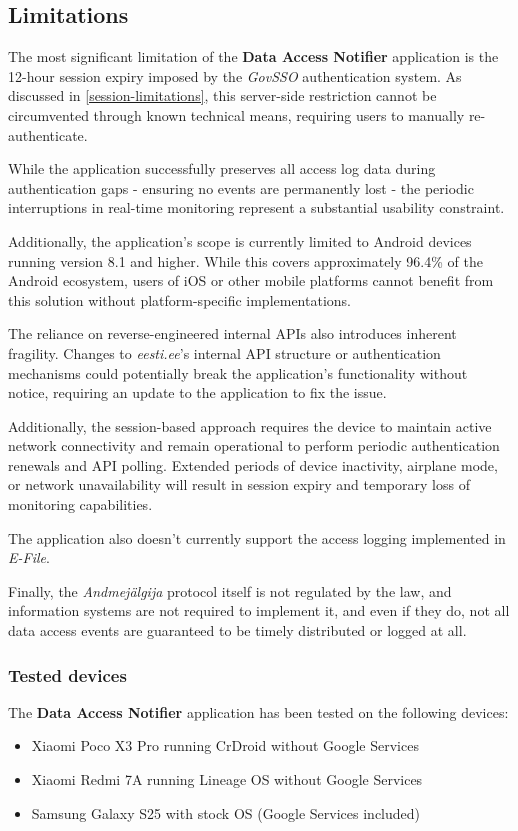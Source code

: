 \subsection{Limitations}
The most significant limitation of the \textbf{Data Access Notifier} application is the 12-hour session expiry imposed by the \textit{GovSSO} authentication system. As discussed in \ref{session-limitations}, this server-side restriction cannot be circumvented through known technical means, requiring users to manually re-authenticate.

While the application successfully preserves all access log data during authentication gaps - ensuring no events are permanently lost - the periodic interruptions in real-time monitoring represent a substantial usability constraint.

Additionally, the application's scope is currently limited to Android devices running version 8.1 and higher. While this covers approximately 96.4\% of the Android ecosystem, users of iOS or other mobile platforms cannot benefit from this solution without platform-specific implementations.

The reliance on reverse-engineered internal APIs also introduces inherent fragility. Changes to \textit{eesti.ee}'s internal API structure or authentication mechanisms could potentially break the application's functionality without notice, requiring an update to the application to fix the issue.

Additionally, the session-based approach requires the device to maintain active network connectivity and remain operational to perform periodic authentication renewals and API polling. Extended periods of device inactivity, airplane mode, or network unavailability will result in session expiry and temporary loss of monitoring capabilities.

The application also doesn't currently support the access logging implemented in \textit{E-File}.

Finally, the \textit{Andmejälgija} protocol itself is not regulated by the law, and information systems are not required to implement it, and even if they do, not all data access events are guaranteed to be timely distributed or logged at all.

\subsubsection{Tested devices}
The \textbf{Data Access Notifier} application has been tested on the following devices:
\begin{itemize}
    \item Xiaomi Poco X3 Pro running CrDroid without Google Services 
    \item Xiaomi Redmi 7A running Lineage OS without Google Services
    \item Samsung Galaxy S25 with stock OS (Google Services included)
\end{itemize}


